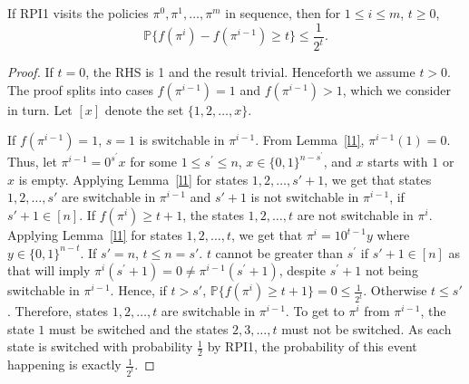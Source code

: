 \begin{appendices}
\begin{lemma}
\label{l4}
    If RPI1 visits the policies $\pi^0, \pi^1, \dots, \pi^m$ in sequence, then for $1\le i \le m$, $t\ge 0$, $$\mathbb{P}\{f(\pi^{i}) - f(\pi^{i-1}) \ge t\} \le \frac{1}{2^t}.$$
\end{lemma}


\begin{proof}


If $t=0$, the RHS is 1 and the result trivial. Henceforth we assume $t > 0$. The proof splits into cases $f(\pi^{i - 1}) = 1$ and $f(\pi^{i - 1}) > 1$, which we consider in turn. 
Let $[x]$ denote the set $\{1, 2, \dots, x\}.$

If $f(\pi^{i-1})=1$, $s=1$ is switchable in $\pi^{i-1}$. From Lemma~\ref{l1}, $\pi^{i-1}(1)=0$. Thus, let $\pi^{i-1}=0^{s^\prime}x$ for some $1 \le s^\prime \le n$, $x\in \{0,1\}^{n-s^\prime}$, and $x$ starts with $1$ or $x$ is empty. Applying Lemma~\ref{l1} for states $1,2,\dots,s'+1$, we get that states $1,2,\dots,s'$ are switchable in $\pi^{i-1}$ and $s'+1$ is not switchable in $\pi^{i-1}$, if $s'+1\in [n]$. If $f(\pi^{i})\ge t+1$, the states $1,2,\dots,t$ are not switchable in $\pi^i$. Applying Lemma~\ref{l1} for states $1,2,\dots,t$, we get that $\pi^{i}=10^{t-1}y$ where $y\in \{0,1\}^{n-t}$. If $s'=n$, $t\le n=s'$. $t$ cannot be greater than $s^\prime$ if $s'+1\in [n]$ as that will imply $\pi^{i}(s^\prime+1)=0\ne \pi^{i-1}(s^\prime+1)$, despite $s^\prime+1$ not being switchable in $\pi^{i-1}$. Hence, if $t > s'$, $\mathbb{P}\{f(\pi^i)\ge t+1\}=0\le \frac{1}{2^t}$. Otherwise $t \le s'$. Therefore, states $1,2,\dots,t$ are switchable in $\pi^{i-1}$. To get to $\pi^i$ from $\pi^{i-1}$, the state $1$ must be switched and the states $2,3, \dots,t$ must not be switched. As each state is switched with probability $\frac{1}{2}$ by RPI1, the probability of this event happening is exactly $\frac{1}{2^t}$.


\end{proof}
\end{appendices}
